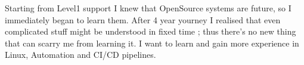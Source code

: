 

\begin{cvparagraph}

Starting from Level1 support I knew that OpenSource systems are future, so I immediately began to learn them. After 4 year yourney I realised that even complicated stuff might be understood in fixed time ; thus there's no new thing that can scarry me from learning it. I want to learn and gain more experience in Linux, Automation and CI/CD pipelines.
\end{cvparagraph}
